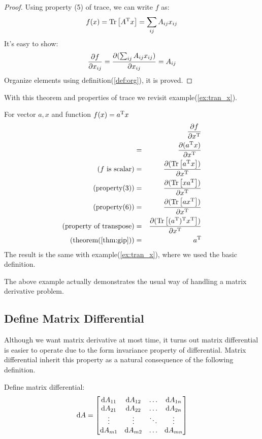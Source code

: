 \begin{proof}
	Using property (5) of trace, we can write $f$ as:
	\begin{equation}
		f(x) = \mathrm{Tr}\left[A^\mathrm{T}x\right] = \sum_{ij}A_{ij}x_{ij}
	\end{equation}
	It's easy to show:
	\begin{equation}
		\dfrac{\partial f}{\partial x_{ij}} = \dfrac{\partial (\sum_{ij}A_{ij}x_{ij})}{\partial x_{ij}} = A_{ij}
	\end{equation}
	Organize elements using definition(\ref{def:org}), it is proved. 
\end{proof}

With this theorem and properties of trace we revisit example(\ref{ex:tran_x}). 
\begin{myex}
	For vector $a,x$ and function $f(x) = a^\mathrm{T}x$
	\begin{eqnarray}
	 &&\dfrac{\partial f}{\partial x^\mathrm{T}} \\
		&=& \dfrac{\partial ( a^\mathrm{T}x )}{\partial x^\mathrm{T}} \\
	\text{($f$ is scalar)}	&=& \dfrac{\partial ( \mathrm{Tr}\left[a^\mathrm{T}x\right] )}{\partial x^\mathrm{T}} \\
	\text{(property(3))}	&=& \dfrac{\partial ( \mathrm{Tr}\left[xa^\mathrm{T}\right] )}{\partial x^\mathrm{T}} \\
	\text{(property(6))}	&=& \dfrac{\partial ( \mathrm{Tr}\left[ax^\mathrm{T}\right] )}{\partial x^\mathrm{T}} \\
	\text{(property of transpose)}	&=& \dfrac{\partial ( \mathrm{Tr}\left[(a^\mathrm{T})^\mathrm{T}x^\mathrm{T}\right] )}{\partial x^\mathrm{T}} \\
	\text{(theorem(\ref{thm:gip}))}	&=& a^\mathrm{T}
	\end{eqnarray}
	The result is the same with example(\ref{ex:tran_x}), 
	where we used the basic definition. 
\end{myex}

The above example actually demonstrates the usual way of handling a 
matrix derivative problem. 

\subsection{Define Matrix Differential}

Although we want matrix derivative at most time, it turns out 
matrix differential is easier to operate due to the 
form invariance property of differential. Matrix differential 
inherit this property as a natural consequence of the 
following definition. 

\begin{mydef}
	\label{def:mdiff}
	Define matrix differential:
	\begin{equation}
		\mathrm{d}A = \left[
		\begin{matrix}
			\mathrm{d}A_{11} & \mathrm{d}A_{12} & \ldots &\mathrm{d}A_{1n}\\
			\mathrm{d}A_{21} & \mathrm{d}A_{22} & \ldots &\mathrm{d}A_{2n}\\
			\vdots & \vdots & \ddots & \vdots \\
			\mathrm{d}A_{m1} & \mathrm{d}A_{m2} & \ldots &\mathrm{d}A_{mn}\\
		\end{matrix}
		\right]
	\end{equation}	 
\end{mydef}

